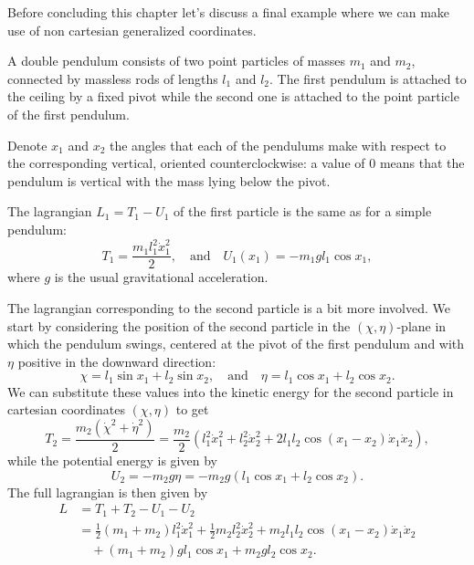 \documentclass[english,fontsize=11pt,paper=a5,oneside]{scrbook}
\theoremstyle{definition}
\newenvironment{example}
  {\pushQED{\qed}\renewcommand{\qedsymbol}{$\lozenge$}\examplex}
  {\popQED\endexamplex}
\begin{document}
Before concluding this chapter let's discuss a final example where we can make use of non cartesian generalized coordinates.

\begin{example}[Double pendulum]\label{ex:2pendulum}
    A double pendulum consists of two point particles of masses $m_1$ and $m_2$, connected by massless rods of lengths $l_1$ and $l_2$. The first pendulum is attached to the ceiling by a fixed pivot while the second one is attached to the point particle of the first pendulum.

     Denote $x_1$ and $x_2$ the angles that each of the pendulums make with respect to the corresponding vertical, oriented counterclockwise: a value of $0$ means that the pendulum is vertical with the mass lying below the pivot.
    
    The lagrangian $L_1 = T_1 - U_1$ of the first particle is the same as for a simple pendulum:
    \begin{equation}
        T_1 = \frac{m_1 l_1^2 \dot x_1^2}2,
        \quad\mbox{and}\quad
        U_1(x_1) = -m_1 g l_1 \cos x_1,
    \end{equation}
    where $g$ is the usual gravitational acceleration.

    The lagrangian corresponding to the second particle is a bit more involved. We start by considering the position of the second particle in the $(\chi,\eta)$-plane in which the pendulum swings, centered at the pivot of the first pendulum and with $\eta$ positive in the downward direction:
    \begin{equation}
        \chi = l_1\sin x_1 + l_2\sin x_2,
        \quad\mbox{and}\quad
        \eta = l_1\cos x_1 + l_2\cos x_2.
    \end{equation}
    We can substitute these values into the kinetic energy for the second particle in cartesian coordinates $(\chi,\eta)$ to get
    \begin{equation}
        T_2 = \frac {m_2 (\dot\chi^2 + \dot\eta^2)}2
            = \frac {m_2}2 \left(
                l_1^2 \dot x_1^2 + l_2^2 \dot x_2^2
                + 2l_1l_2 \cos(x_1 -x_2)\dot x_1 \dot x_2
                \right),
    \end{equation}
    while the potential energy is given by
    \begin{equation}
        U_2 = -m_2 g \eta = -m_2g (l_1\cos x_1 + l_2\cos x_2).
    \end{equation}
    The full lagrangian is then given by
    \begin{align}
        L &= T_1 + T_2 - U_1 - U_2 \\
          &= \frac12 (m_1 + m_2)  l_1^2 \dot x_1^2
             + \frac 12 m_2 l_2^2 \dot x_2^2
             + m_2l_1l_2 \cos(x_1 -x_2)\dot x_1 \dot x_2 \\
             &\quad+ (m_1 + m_2) g l_1 \cos x_1
             + m_2gl_2\cos x_2.
    \end{align}


\end{example}
\end{document}
